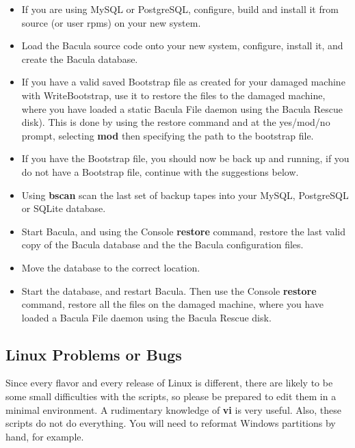 \begin{itemize}
\item If you are using MySQL or PostgreSQL, configure, build and install it
   from  source (or user rpms) on your new system.  
\item Load the Bacula source code onto your new system, configure,  install
   it, and create the Bacula database.  
\item If you have a valid saved Bootstrap file as created for your  damaged
   machine with WriteBootstrap, use it to restore the  files to the damaged
   machine, where you have loaded a static Bacula  File daemon using the Bacula
Rescue disk). This is done by  using the restore command and at the yes/mod/no
prompt,  selecting {\bf mod} then specifying the path to the bootstrap  file. 
\item If you have the Bootstrap file, you should now be back up and  running,
   if you do not have a Bootstrap file, continue with the  suggestions below.  
\item Using {\bf bscan} scan the last set of backup tapes into your  MySQL,
   PostgreSQL or SQLite database.  
\item Start Bacula, and using the Console {\bf restore} command,  restore the
   last valid copy of the Bacula database and the  the Bacula configuration
   files.  
\item Move the database to the correct location. 
\item Start the database, and restart Bacula. Then use  the Console {\bf
   restore} command, restore all the files  on the damaged machine, where you
   have loaded a Bacula File  daemon using the Bacula Rescue disk. 
\end{itemize}

\label{problems2}

\subsection*{Linux Problems or Bugs}

Since every flavor and every release of Linux is different, there are likely
to be some small difficulties with the scripts, so please be prepared to edit
them in a minimal environment. A rudimentary knowledge of {\bf vi} is very
useful. Also, these scripts do not do everything. You will need to reformat
Windows partitions by hand, for example. 

